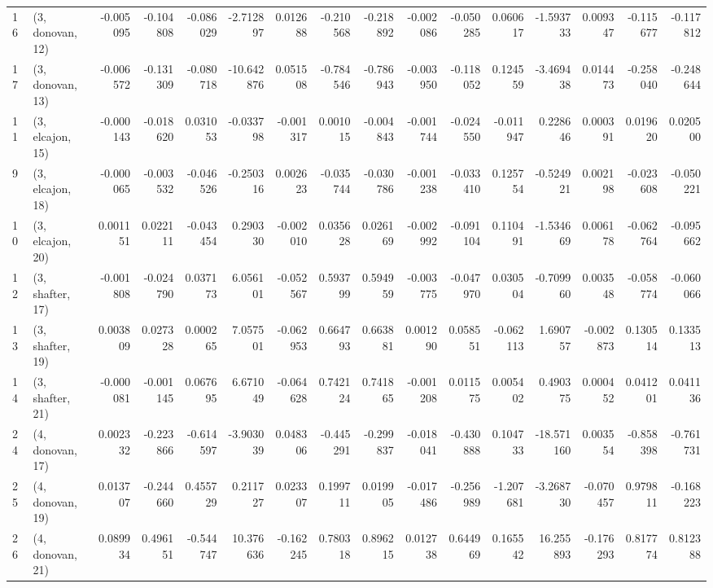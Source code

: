 \begin{tabular}{llrrrrrrrrrrrrrr}
16 &  (3, donovan, 12) &  -0.005095 & -0.104808 & -0.086029 &  -2.712897 &  0.012688 &  -0.210568 & -0.218892 & -0.002086 & -0.050285 &  0.060617 &  -1.593733 &  0.009347 & -0.115677 & -0.117812 \\
17 &  (3, donovan, 13) &  -0.006572 & -0.131309 & -0.080718 & -10.642876 &  0.051508 &  -0.784546 & -0.786943 & -0.003950 & -0.118052 &  0.124559 &  -3.469438 &  0.014473 & -0.258040 & -0.248644 \\
11 &  (3, elcajon, 15) &  -0.000143 & -0.018620 &  0.031053 &  -0.033798 & -0.001317 &   0.001015 & -0.004843 & -0.001744 & -0.024550 & -0.011947 &   0.228646 &  0.000391 &  0.019620 &  0.020500 \\
9  &  (3, elcajon, 18) &  -0.000065 & -0.003532 & -0.046526 &  -0.250316 &  0.002623 &  -0.035744 & -0.030786 & -0.001238 & -0.033410 &  0.125754 &  -0.524921 &  0.002198 & -0.023608 & -0.050221 \\
10 &  (3, elcajon, 20) &   0.001151 &  0.022111 & -0.043454 &   0.290330 & -0.002010 &   0.035628 &  0.026169 & -0.002992 & -0.091104 &  0.110491 &  -1.534669 &  0.006178 & -0.062764 & -0.095662 \\
12 &  (3, shafter, 17) &  -0.001808 & -0.024790 &  0.037173 &   6.056101 & -0.052567 &   0.593799 &  0.594959 & -0.003775 & -0.047970 &  0.030504 &  -0.709960 &  0.003548 & -0.058774 & -0.060066 \\
13 &  (3, shafter, 19) &   0.003809 &  0.027328 &  0.000265 &   7.057501 & -0.062953 &   0.664793 &  0.663881 &  0.001290 &  0.058551 & -0.062113 &   1.690757 & -0.002873 &  0.130514 &  0.133513 \\
14 &  (3, shafter, 21) &  -0.000081 & -0.001145 &  0.067695 &   6.671049 & -0.064628 &   0.742124 &  0.741865 & -0.001208 &  0.011575 &  0.005402 &   0.490375 &  0.000452 &  0.041201 &  0.041136 \\
24 &  (4, donovan, 17) &   0.002332 & -0.223866 & -0.614597 &  -3.903039 &  0.048306 &  -0.445291 & -0.299837 & -0.018041 & -0.430888 &  0.104733 & -18.571160 &  0.003554 & -0.858398 & -0.761731 \\
25 &  (4, donovan, 19) &   0.013707 & -0.244660 &  0.455729 &   0.211727 &  0.023307 &   0.199711 &  0.019905 & -0.017486 & -0.256989 & -1.207681 &  -3.268730 & -0.070457 &  0.979811 & -0.168223 \\
26 &  (4, donovan, 21) &   0.089934 &  0.496151 & -0.544747 &  10.376636 & -0.162245 &   0.780318 &  0.896215 &  0.012738 &  0.644969 &  0.165542 &  16.255893 & -0.176293 &  0.817774 &  0.812388 \\

\end{tabular}
